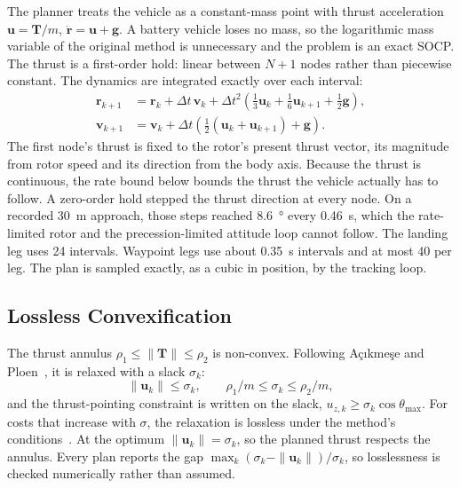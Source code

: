 \documentclass[journal]{IEEEtran}
\newcommand{\vect}[1]{\bm{#1}}
\begin{document}
The planner treats the vehicle as a constant-mass point with thrust acceleration $\vect{u} = \vect{T}/m$, $\ddot{\vect{r}} = \vect{u} + \vect{g}$.
A battery vehicle loses no mass, so the logarithmic mass variable of the original method is unnecessary and the problem is an exact SOCP.
The thrust is a first-order hold: linear between $N + 1$ nodes rather than piecewise constant.
The dynamics are integrated exactly over each interval:
\begin{equation}
\begin{split}
\vect{r}_{k+1} &= \vect{r}_k + \Delta t\,\vect{v}_k + \Delta t^2\left(\tfrac13\vect{u}_k + \tfrac16\vect{u}_{k+1} + \tfrac12\vect{g}\right),\\
\vect{v}_{k+1} &= \vect{v}_k + \Delta t\left(\tfrac12(\vect{u}_k + \vect{u}_{k+1}) + \vect{g}\right).
\end{split}
\label{eq:foh}
\end{equation}
The first node's thrust is fixed to the rotor's present thrust vector, its magnitude from rotor speed and its direction from the body axis.
Because the thrust is continuous, the rate bound below bounds the thrust the vehicle actually has to follow.
A zero-order hold stepped the thrust direction at every node.
On a recorded \SI{30}{\metre} approach, those steps reached \SI{8.6}{\degree} every \SI{0.46}{\second}, which the rate-limited rotor and the precession-limited attitude loop cannot follow.
The landing leg uses 24 intervals.
Waypoint legs use about \SI{0.35}{\second} intervals and at most 40 per leg.
The plan is sampled exactly, as a cubic in position, by the tracking loop.

\subsection{Lossless Convexification}
\label{sec:lcvx}

The thrust annulus $\rho_1 \le \|\vect{T}\| \le \rho_2$ is non-convex.
Following A\c{c}{\i}kme\c{s}e and Ploen~\cite{acikmese2007}, it is relaxed with a slack $\sigma_k$:
\begin{equation}
\|\vect{u}_k\| \le \sigma_k, \qquad \rho_1/m \le \sigma_k \le \rho_2/m ,
\label{eq:lcvx}
\end{equation}
and the thrust-pointing constraint is written on the slack, $u_{z,k} \ge \sigma_k\cos\theta_{\max}$.
For costs that increase with $\sigma$, the relaxation is lossless under the method's conditions~\cite{acikmese2007,acikmese2011lcvx}.
At the optimum $\|\vect{u}_k\| = \sigma_k$, so the planned thrust respects the annulus.
Every plan reports the gap $\max_k(\sigma_k - \|\vect{u}_k\|)/\sigma_k$, so losslessness is checked numerically rather than assumed.
\end{document}
